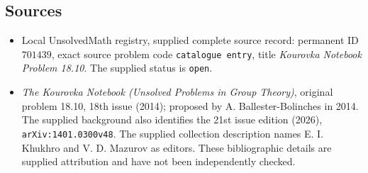 \documentclass[11pt]{article}
\begin{document}
\subsection{Sources}
\begin{itemize}
\item Local UnsolvedMath registry, supplied complete source record: permanent ID \(701439\), exact source problem code \texttt{catalogue entry}, title \emph{Kourovka Notebook Problem 18.10}. The supplied status is \texttt{open}.
\item \emph{The Kourovka Notebook (Unsolved Problems in Group Theory)}, original problem 18.10, 18th issue (2014); proposed by A. Ballester-Bolinches in 2014. The supplied background also identifies the 21st issue edition (2026), \texttt{arXiv:1401.0300v48}. The supplied collection description names E. I. Khukhro and V. D. Mazurov as editors. These bibliographic details are supplied attribution and have not been independently checked.
\end{itemize}
\end{document}
